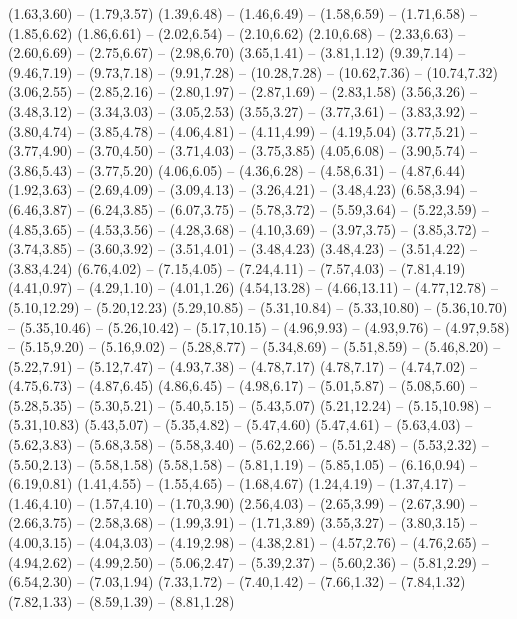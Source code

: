 \expandafter\def\csname geo:Autobahn:A4\endcsname{
  (1.63,3.60) -- (1.79,3.57)
  (1.39,6.48) -- (1.46,6.49) -- (1.58,6.59) -- (1.71,6.58) -- (1.85,6.62)
  (1.86,6.61) -- (2.02,6.54) -- (2.10,6.62)
  (2.10,6.68) -- (2.33,6.63) -- (2.60,6.69) -- (2.75,6.67) -- (2.98,6.70)
  (3.65,1.41) -- (3.81,1.12)
  (9.39,7.14) -- (9.46,7.19) -- (9.73,7.18) -- (9.91,7.28) -- (10.28,7.28) -- (10.62,7.36) -- (10.74,7.32)}
\expandafter\def\csname geo:Autobahn:A5\endcsname{
  (3.06,2.55) -- (2.85,2.16) -- (2.80,1.97) -- (2.87,1.69) -- (2.83,1.58)
  (3.56,3.26) -- (3.48,3.12) -- (3.34,3.03) -- (3.05,2.53)
  (3.55,3.27) -- (3.77,3.61) -- (3.83,3.92) -- (3.80,4.74) -- (3.85,4.78) -- (4.06,4.81) -- (4.11,4.99) -- (4.19,5.04)
  (3.77,5.21) -- (3.77,4.90) -- (3.70,4.50) -- (3.71,4.03) -- (3.75,3.85)
  (4.05,6.08) -- (3.90,5.74) -- (3.86,5.43) -- (3.77,5.20)
  (4.06,6.05) -- (4.36,6.28) -- (4.58,6.31) -- (4.87,6.44)}
\expandafter\def\csname geo:Autobahn:A6\endcsname{
  (1.92,3.63) -- (2.69,4.09) -- (3.09,4.13) -- (3.26,4.21) -- (3.48,4.23)
  (6.58,3.94) -- (6.46,3.87) -- (6.24,3.85) -- (6.07,3.75) -- (5.78,3.72) -- (5.59,3.64) -- (5.22,3.59) -- (4.85,3.65) -- (4.53,3.56) -- (4.28,3.68) -- (4.10,3.69) -- (3.97,3.75) -- (3.85,3.72) -- (3.74,3.85) -- (3.60,3.92) -- (3.51,4.01) -- (3.48,4.23)
  (3.48,4.23) -- (3.51,4.22) -- (3.83,4.24)
  (6.76,4.02) -- (7.15,4.05) -- (7.24,4.11) -- (7.57,4.03) -- (7.81,4.19)}
\expandafter\def\csname geo:Autobahn:A7\endcsname{
  (4.41,0.97) -- (4.29,1.10) -- (4.01,1.26)
  (4.54,13.28) -- (4.66,13.11) -- (4.77,12.78) -- (5.10,12.29) -- (5.20,12.23)
  (5.29,10.85) -- (5.31,10.84) -- (5.33,10.80) -- (5.36,10.70) -- (5.35,10.46) -- (5.26,10.42) -- (5.17,10.15) -- (4.96,9.93) -- (4.93,9.76) -- (4.97,9.58) -- (5.15,9.20) -- (5.16,9.02) -- (5.28,8.77) -- (5.34,8.69) -- (5.51,8.59) -- (5.46,8.20) -- (5.22,7.91) -- (5.12,7.47) -- (4.93,7.38) -- (4.78,7.17)
  (4.78,7.17) -- (4.74,7.02) -- (4.75,6.73) -- (4.87,6.45)
  (4.86,6.45) -- (4.98,6.17) -- (5.01,5.87) -- (5.08,5.60) -- (5.28,5.35) -- (5.30,5.21) -- (5.40,5.15) -- (5.43,5.07)
  (5.21,12.24) -- (5.15,10.98) -- (5.31,10.83)
  (5.43,5.07) -- (5.35,4.82) -- (5.47,4.60)
  (5.47,4.61) -- (5.63,4.03) -- (5.62,3.83) -- (5.68,3.58) -- (5.58,3.40) -- (5.62,2.66) -- (5.51,2.48) -- (5.53,2.32) -- (5.50,2.13) -- (5.58,1.58)
  (5.58,1.58) -- (5.81,1.19) -- (5.85,1.05) -- (6.16,0.94) -- (6.19,0.81)}
\expandafter\def\csname geo:Autobahn:A8\endcsname{
  (1.41,4.55) -- (1.55,4.65) -- (1.68,4.67)
  (1.24,4.19) -- (1.37,4.17) -- (1.46,4.10) -- (1.57,4.10) -- (1.70,3.90)
  (2.56,4.03) -- (2.65,3.99) -- (2.67,3.90) -- (2.66,3.75) -- (2.58,3.68) -- (1.99,3.91) -- (1.71,3.89)
  (3.55,3.27) -- (3.80,3.15) -- (4.00,3.15) -- (4.04,3.03) -- (4.19,2.98) -- (4.38,2.81) -- (4.57,2.76) -- (4.76,2.65) -- (4.94,2.62) -- (4.99,2.50) -- (5.06,2.47) -- (5.39,2.37) -- (5.60,2.36) -- (5.81,2.29) -- (6.54,2.30) -- (7.03,1.94)
  (7.33,1.72) -- (7.40,1.42) -- (7.66,1.32) -- (7.84,1.32)
  (7.82,1.33) -- (8.59,1.39) -- (8.81,1.28)}

